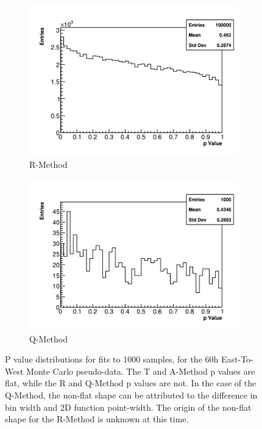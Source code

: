\begin{figure}[]
    \begin{subfigure}[t]{0.45\textwidth}
        \centering
        \includegraphics[width=\textwidth]{PValues_RMethod}
        \caption{R-Method}
    \end{subfigure}
    \hspace{1mm}
    \begin{subfigure}[t]{0.45\textwidth}
        \centering
        \includegraphics[width=\textwidth]{PValues_QMethod}
        \caption{Q-Method}
    \end{subfigure}
\caption[]{P value distributions for fits to 1000 samples, for the 60h East-To-West Monte Carlo pseudo-data. The T and A-Method p values are flat, while the R and Q-Method p values are not. In the case of the Q-Method, the non-flat shape can be attributed to the difference in bin width and 2D function point-width. The origin of the non-flat shape for the R-Method is unknown at this time.}
\label{fig:pValues}
\end{figure}



